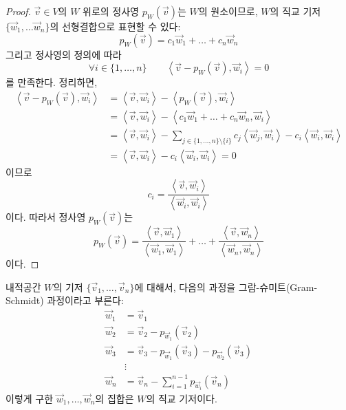 \documentclass[../engineering_mathematics_lecture_note.tex]{subfiles}
\begin{document}
\begin{proof}
    $\vec v \in V$의 $W$ 위로의 정사영 $p_W (\vec v)$는 $W$의 원소이므로, $W$의 직교 기저 $\{\vec w_1, \dots \vec w_n\}$의 선형결합으로 표현할 수 있다:
    \begin{equation*}
        p_W (\vec v) = c_1 \vec w_1 + \dots + c_n \vec w_n
    \end{equation*}
    그리고 정사영의 정의에 따라
    \begin{equation*}
        \forall i \in \{1, \dots, n\} \qquad \left<\vec v - p_W (\vec v), \vec w_i\right> = 0
    \end{equation*}
    를 만족한다.
    정리하면,
    \begin{align*}
        \left<\vec v - p_W (\vec v), \vec w_i\right> &= \left<\vec v, \vec w_i\right> - \left<p_W (\vec v), \vec w_i\right>\\
                                                     &= \left<\vec v, \vec w_i \right> - \left<c_1 \vec w_1 + \dots + c_n \vec w_n, \vec w_i\right>\\
                                                     &= \left<\vec v, \vec w_i \right> - \sum_{j \in \{1, \dots, n\} \setminus \{i\}} c_j \left<\vec w_j, \vec w_i\right> - c_i \left<\vec w_i, \vec w_i\right>\\
                                                     &= \left<\vec v, \vec w_i \right> - c_i \left<\vec w_i, \vec w_i\right> = 0
    \end{align*}
    이므로
    \begin{equation*}
        c_i = \frac{\left<\vec v, \vec w_i\right>}{\left<\vec w_i, \vec w_i\right>}
    \end{equation*}
    이다.
    따라서 정사영 $p_W (\vec v)$는
    \begin{equation*}
        p_W (\vec v) = \frac{\left<\vec v, \vec w_1\right>}{\left<\vec w_1, \vec w_1\right>} + \dots + \frac{\left<\vec v, \vec w_n\right>}{\left<\vec w_n, \vec w_n\right>}
    \end{equation*}
    이다.
\end{proof}

\begin{theorem} 
    내적공간 $W$의 기저 $\{\vec v_1, \dots, \vec v_n\}$에 대해서, 다음의 과정을 그람-슈미트(Gram-Schmidt) 과정이라고 부른다:
    \begin{align*}
        \vec w_1 &= \vec v_1\\
        \vec w_2 &= \vec v_2 - p_{\vec w_1} (\vec v_2)\\
        \vec w_3 &= \vec v_3 - p_{\vec w_1} (\vec v_3) - p_{\vec w_2} (\vec v_3)\\
                 &\vdots\\
        \vec w_n &= \vec v_n - \sum_{i = 1}^{n - 1} p_{\vec w_i} (\vec v_n)
    \end{align*}
    이렇게 구한 $\vec w_1, \dots, \vec w_n$의 집합은 $W$의 직교 기저이다.
\end{theorem}
\end{document}
